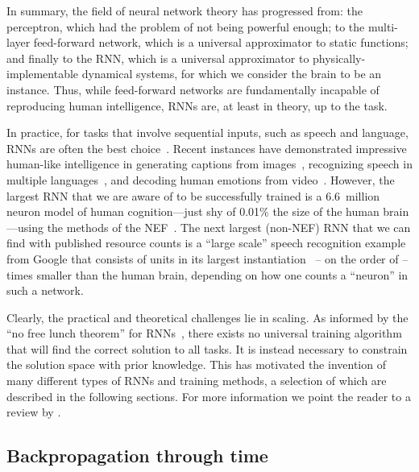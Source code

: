 In summary, the field of neural network theory has progressed from: the perceptron, which had the problem of not being powerful enough; to the multi-layer feed-forward network, which is a universal approximator to static functions; and finally to the RNN, which is a universal approximator to physically-implementable dynamical systems, for which we consider the brain to be an instance.
Thus, while feed-forward networks are fundamentally incapable of reproducing human intelligence, RNNs are, at least in theory, up to the task.

In practice, for tasks that involve sequential inputs, such as speech and language, RNNs are often the best choice~\citep{lecun2015deep}.
Recent instances have demonstrated impressive human-like intelligence in generating captions from images~\citep{vinyals2015show}, recognizing speech in multiple languages~\citep{amodei2016deep}, and decoding human emotions from video~\citep{ebrahimi2015recurrent}.
However, the largest RNN that we are aware of to be successfully trained is a 6.6~million neuron model of human cognition---just shy of 0.01\% the size of the human brain---using the methods of the NEF~\citep{choo2018}.
The next largest (non-NEF) RNN that we can find with published resource counts is a ``large scale'' speech recognition example from Google that consists of  units in its largest instantiation~\citep[][Table~1]{sak2014long} -- on the order of -- times smaller than the human brain, depending on how one counts a ``neuron'' in such a network.

Clearly, the practical and theoretical challenges lie in scaling.
As informed by the ``no free lunch theorem'' for RNNs~\citep{wiklicky1994non}, there exists no universal training algorithm that will find the correct solution to all tasks.
It is instead necessary to constrain the solution space with prior knowledge.
This has motivated the invention of many different types of RNNs and training methods, a selection of which are described in the following sections.
For more information we point the reader to a review by \citet{salehinejad2017recent}.

\subsection{Backpropagation through time}

